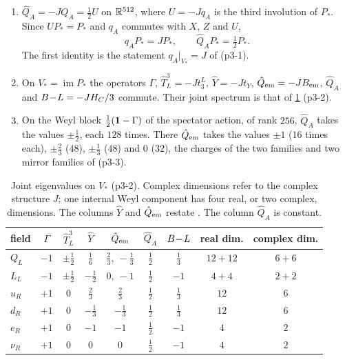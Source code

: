 \begin{proposition}
\label{p3:prop:charges}
\begin{enumerate}[label=(\roman*),leftmargin=2.2em]
\item $\hat Q_A=-JQ_A=\tfrac12U$ on $\mathbb{R}^{512}$, where $U=-Jq_A$ is the third involution of $P_*$. Since $UP_*=P_*$ and $q_A$ commutes with $X$, $Z$ and $U$,
\[
q_AP_*=JP_*,\qquad \hat Q_AP_*=\tfrac12P_* .
\]
The first identity is the statement $q_A|_{V_*}=J$ of \cite[Section~8]{ES17} (p3-1).
\item On $V_*=\operatorname{im}P_*$ the operators $\Gamma$, $\hat T^3_L=-Jt^L_3$, $\hat Y=-Jt_Y$, $\hat Q_{\rm em}=-JB_{\rm em}$, $\hat Q_A$ and $B\!-\!L=-JH_C/3$ commute. Their
joint spectrum is that of \cref{p3:tab:charges} (p3-2).
\item On the Weyl block $\tfrac12(\mathbf 1-\Gamma)$ of the spectator action, of rank $256$, $\hat Q_A$ takes the values $\pm\tfrac12$, each $128$ times. There
$\hat Q_{\rm em}$ takes the values $\pm1$ ($16$ times each), $\pm\tfrac23$ ($48$), $\pm\tfrac13$ ($48$) and $0$ ($32$), the charges of the two families and two mirror
families of \cite[Prop.~10.12]{ES17} (p3-3).
\end{enumerate}
\end{proposition}

\begin{table}[t]
\centering
\small
\begin{tabular}{@{}lcccccccc@{}}
\toprule
field & $\Gamma$ & $\hat T^3_L$ & $\hat Y$ & $\hat Q_{\rm em}$ & $\hat Q_A$ & $B\!-\!L$ & real dim. & complex dim.\\
\midrule
$Q_L$ & $-1$ & $\pm\tfrac12$ & $\tfrac16$ & $\tfrac23,\ -\tfrac13$ & $\tfrac12$ & $\tfrac13$ & $12+12$ & $6+6$\\
$L_L$ & $-1$ & $\pm\tfrac12$ & $-\tfrac12$ & $0,\ -1$ & $\tfrac12$ & $-1$ & $4+4$ & $2+2$\\
$u_R$ & $+1$ & $0$ & $\tfrac23$ & $\tfrac23$ & $\tfrac12$ & $\tfrac13$ & $12$ & $6$\\
$d_R$ & $+1$ & $0$ & $-\tfrac13$ & $-\tfrac13$ & $\tfrac12$ & $\tfrac13$ & $12$ & $6$\\
$e_R$ & $+1$ & $0$ & $-1$ & $-1$ & $\tfrac12$ & $-1$ & $4$ & $2$\\
$\nu_R$ & $+1$ & $0$ & $0$ & $0$ & $\tfrac12$ & $-1$ & $4$ & $2$\\
\bottomrule
\end{tabular}
\caption{Joint eigenvalues on $V_*$ (p3-2). Complex dimensions refer to the complex structure $J$; one internal Weyl component has four real, or two complex,
dimensions. The columns $\hat Y$ and $\hat Q_{\rm em}$ restate \cite[Prop.~8.4]{ES17}. The column $\hat Q_A$ is constant.}
\label{p3:tab:charges}
\end{table}

